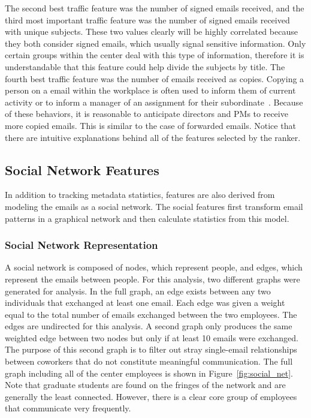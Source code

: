 \documentclass[12pt]{report}
\begin{document}
The second best traffic feature was the number of signed emails received, and the third most important traffic feature was the number of signed emails received with unique subjects.
These two values clearly will be highly correlated because they both consider signed emails, which usually signal sensitive information.
Only certain groups within the center deal with this type of information, therefore it is understandable that this feature could help divide the subjects by title.
The fourth best traffic feature was the number of emails received as copies.
Copying a person on a email within the workplace is often used to inform them of current activity or to inform a manager of an assignment for their subordinate~\cite{skovholt2006email}.
Because of these behaviors, it is reasonable to anticipate directors and PMs to receive more copied emails.
This is similar to the case of forwarded emails.
Notice that there are intuitive explanations behind all of the features selected by the ranker.


\subsection{Social Network Features}
In addition to tracking metadata statistics, features are also derived from modeling the emails as a social network.
The social features first transform email patterns in a graphical network and then calculate statistics from this model.


\subsubsection{Social Network Representation}
A social network is composed of nodes, which represent people, and edges, which represent the emails between people.
For this analysis, two different graphs were generated for analysis.
In the full graph, an edge exists between any two individuals that exchanged at least one email.
Each edge was given a weight equal to the total number of emails exchanged between the two employees.
The edges are undirected for this analysis.
A second graph only produces the same weighted edge between two nodes but only if at least 10 emails were exchanged.
The purpose of this second graph is to filter out stray single-email relationships between coworkers that do not constitute meaningful communication.
The full graph including all of the center employees is shown in Figure~\ref{fig:social_net}.  Note that graduate students are found on the fringes of the network and are generally the least connected.  However, there is a clear core group of employees that communicate very frequently.
\end{document}
